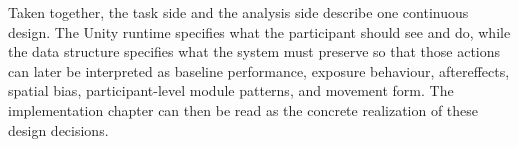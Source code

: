 Taken together, the task side and the analysis side describe one continuous design. The Unity runtime specifies what the participant should see and do, while the data structure specifies what the system must preserve so that those actions can later be interpreted as baseline performance, exposure behaviour, aftereffects, spatial bias, participant-level module patterns, and movement form. The implementation chapter can then be read as the concrete realization of these design decisions.
